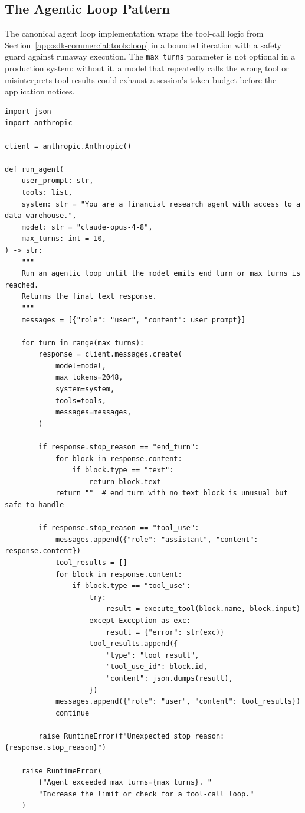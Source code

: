 \subsection{The Agentic Loop Pattern}
\label{app:sdk-commercial:agent-loop:pattern}

The canonical agent loop implementation wraps the tool-call logic from
Section~\ref{app:sdk-commercial:tools:loop} in a bounded iteration with a safety
guard against runaway execution. The \texttt{max\_turns} parameter is not optional in
a production system: without it, a model that repeatedly calls the wrong tool or
misinterprets tool results could exhaust a session's token budget before the
application notices.

\begin{verbatim}
import json
import anthropic

client = anthropic.Anthropic()

def run_agent(
    user_prompt: str,
    tools: list,
    system: str = "You are a financial research agent with access to a data warehouse.",
    model: str = "claude-opus-4-8",
    max_turns: int = 10,
) -> str:
    """
    Run an agentic loop until the model emits end_turn or max_turns is reached.
    Returns the final text response.
    """
    messages = [{"role": "user", "content": user_prompt}]

    for turn in range(max_turns):
        response = client.messages.create(
            model=model,
            max_tokens=2048,
            system=system,
            tools=tools,
            messages=messages,
        )

        if response.stop_reason == "end_turn":
            for block in response.content:
                if block.type == "text":
                    return block.text
            return ""  # end_turn with no text block is unusual but safe to handle

        if response.stop_reason == "tool_use":
            messages.append({"role": "assistant", "content": response.content})
            tool_results = []
            for block in response.content:
                if block.type == "tool_use":
                    try:
                        result = execute_tool(block.name, block.input)
                    except Exception as exc:
                        result = {"error": str(exc)}
                    tool_results.append({
                        "type": "tool_result",
                        "tool_use_id": block.id,
                        "content": json.dumps(result),
                    })
            messages.append({"role": "user", "content": tool_results})
            continue

        raise RuntimeError(f"Unexpected stop_reason: {response.stop_reason}")

    raise RuntimeError(
        f"Agent exceeded max_turns={max_turns}. "
        "Increase the limit or check for a tool-call loop."
    )
\end{verbatim}

